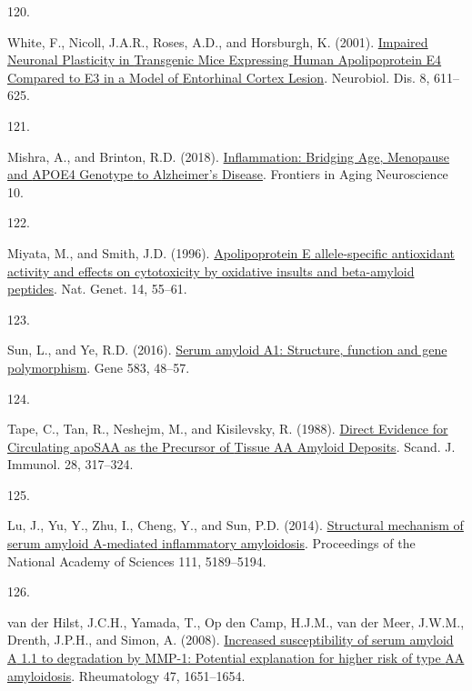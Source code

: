 \documentclass[
]{article}
\newlength{\cslhangindent}
\newlength{\csllabelwidth}
\newlength{\cslentryspacingunit} %
\newenvironment{CSLReferences}[2] %
 {%
  \setlength{\parindent}{0pt}
  \ifodd #1
  \let\oldpar\par
  \def\par{\hangindent=\cslhangindent\oldpar}
  \fi
  \setlength{\parskip}{#2\cslentryspacingunit}
 }%
 {}
\newcommand{\CSLLeftMargin}[1]{\parbox[t]{\csllabelwidth}{#1}}
\newcommand{\CSLRightInline}[1]{\parbox[t]{\linewidth - \csllabelwidth}{#1}\break}
\begin{document}
\begin{CSLReferences}{0}{0}
\leavevmode{}%
\CSLLeftMargin{120. }
\CSLRightInline{White, F., Nicoll, J.A.R., Roses, A.D., and Horsburgh, K. (2001). \href{https://doi.org/10.1006/nbdi.2001.0401}{Impaired {Neuronal Plasticity} in {Transgenic Mice Expressing Human Apolipoprotein E4 Compared} to {E3} in a {Model} of {Entorhinal Cortex Lesion}}. Neurobiol. Dis. 8, 611--625.}

\leavevmode{}%
\CSLLeftMargin{121. }
\CSLRightInline{Mishra, A., and Brinton, R.D. (2018). \href{https://doi.org/10.3389/fnagi.2018.00312}{Inflammation: {Bridging Age}, {Menopause} and {APOE4 Genotype} to {Alzheimer}'s {Disease}}. Frontiers in Aging Neuroscience 10.}

\leavevmode{}%
\CSLLeftMargin{122. }
\CSLRightInline{Miyata, M., and Smith, J.D. (1996). \href{https://doi.org/10.1038/ng0996-55}{Apolipoprotein {E} allele-specific antioxidant activity and effects on cytotoxicity by oxidative insults and beta-amyloid peptides}. Nat. Genet. 14, 55--61.}

\leavevmode{}%
\CSLLeftMargin{123. }
\CSLRightInline{Sun, L., and Ye, R.D. (2016). \href{https://doi.org/10.1016/j.gene.2016.02.044}{Serum amyloid {A1}: {Structure}, function and gene polymorphism}. Gene 583, 48--57.}

\leavevmode{}%
\CSLLeftMargin{124. }
\CSLRightInline{Tape, C., Tan, R., Neshejm, M., and Kisilevsky, R. (1988). \href{https://doi.org/10.1111/j.1365-3083.1988.tb01455.x}{Direct {Evidence} for {Circulating apoSAA} as the {Precursor} of {Tissue AA Amyloid Deposits}}. Scand. J. Immunol. 28, 317--324.}

\leavevmode{}%
\CSLLeftMargin{125. }
\CSLRightInline{Lu, J., Yu, Y., Zhu, I., Cheng, Y., and Sun, P.D. (2014). \href{https://doi.org/10.1073/pnas.1322357111}{Structural mechanism of serum amyloid {A-mediated} inflammatory amyloidosis}. Proceedings of the National Academy of Sciences 111, 5189--5194.}

\leavevmode{}%
\CSLLeftMargin{126. }
\CSLRightInline{van der Hilst, J.C.H., Yamada, T., Op den Camp, H.J.M., van der Meer, J.W.M., Drenth, J.P.H., and Simon, A. (2008). \href{https://doi.org/10.1093/rheumatology/ken371}{Increased susceptibility of serum amyloid {A} 1.1 to degradation by {MMP-1}: Potential explanation for higher risk of type {AA} amyloidosis}. Rheumatology 47, 1651--1654.}


\end{CSLReferences}
\end{document}
